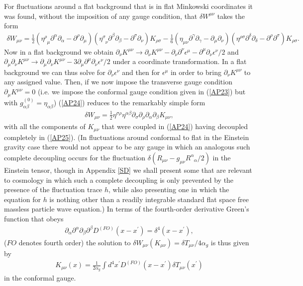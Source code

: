 \documentclass[aps]{revtex4}
\begin{document}
For fluctuations around a flat background that is in flat Minkowski coordinates it was found, without the  imposition of any gauge condition, that $\delta W^{\mu\nu}$ takes the form \cite{Mannheim2006}
%
\begin{eqnarray}
\delta W_{\mu\nu}=\frac{1}{2}(\eta^{\rho}_{\phantom{\rho} \mu} \partial^{\alpha}\partial_{\alpha}-\partial^{\rho}\partial_{\mu})
(\eta^{\sigma}_{\phantom{\sigma} \nu} \partial^{\beta}\partial_{\beta}-
\partial^{\sigma}\partial_{\nu})K_{\rho \sigma}- 
\frac{1}{6}(\eta_{\mu \nu} \partial^{\gamma}\partial_{\gamma}-
\partial_{\mu}\partial_{\nu})(\eta^{\rho \sigma} \partial^{\delta}\partial_{\delta}-
\partial^{\rho}\partial^{\sigma})K_{\rho\sigma}.
\label{AP24}
\end{eqnarray}
%
Now in a flat background we obtain $\partial_{\nu}K^{\mu\nu}\rightarrow \partial_{\nu}K^{\mu\nu}-\partial_{\nu}\partial^{\nu}\epsilon^{\mu}-\partial^{\mu}\partial_{\nu}\epsilon^{\nu}/2$ and $\partial_{\mu}\partial_{\nu}K^{\mu\nu}\rightarrow \partial_{\mu}\partial_{\nu}K^{\mu\nu}-3\partial_{\mu}\partial^{\mu}\partial_{\nu}\epsilon^{\nu}/2$ under a coordinate transformation. In a flat background we can thus solve for $\partial_{\nu}\epsilon^{\nu}$ and then for $\epsilon^{\mu}$ in order to bring $\partial_{\nu}K^{\mu\nu}$ to any assigned value. Then, if we now impose the transverse gauge condition $\partial_{\mu}K^{\mu\nu}=0$ (i.e. we impose the conformal gauge condition given in (\ref{AP23}) but with  $g^{(0)}_{\alpha\beta}=\eta_{\alpha\beta}$) (\ref{AP24}) reduces to the remarkably simple form
%
\begin{eqnarray}
\delta W_{\mu\nu}=\frac{1}{2}\eta^{\sigma\rho}\eta^{\alpha\beta}\partial_{\sigma}\partial_{\rho} \partial_{\alpha}\partial_{\beta}K_{\mu \nu},
\label{AP25}
\end{eqnarray}
%
with all the components of $K_{\mu\nu}$ that were coupled in (\ref{AP24}) having decoupled completely in (\ref{AP25}). (In fluctuations around conformal to flat in the Einstein gravity case there would not appear to be any gauge in which an analogous such complete decoupling occurs for the fluctuation $\delta(R_{\mu\nu}-g_{\mu\nu}R^{\alpha}_{\phantom{\alpha}\alpha}/2)$ in the Einstein tensor, though in Appendix \ref{SD} we shall present some that are relevant to cosmology in which such a complete decoupling is only prevented by the presence of the fluctuation trace $h$, while also presenting one in which the equation for $h$ is nothing other than a readily integrable standard flat space free massless particle wave equation.) In terms of the fourth-order derivative Green's function that obeys
%
\begin{eqnarray}
\partial_{\alpha}\partial^{\alpha} \partial_{\beta}\partial^{\beta}D^{(FO)}(x-x^{\prime})=\delta^4(x-x^{\prime}),
\label{AP26}
\end{eqnarray}
%
($FO$ denotes fourth order) the solution to $\delta W_{\mu\nu}(K_{\mu\nu})=\delta T_{\mu\nu}/4\alpha_g$ is thus given by 
%
\begin{eqnarray}
K_{\mu\nu}(x)=\frac{1}{2\alpha_g}\int d^4x^{\prime}D^{(FO)}(x-x^{\prime})\delta T_{\mu\nu}(x^{\prime})
\label{AP27}
\end{eqnarray}
%
in the conformal gauge.
\end{document}
